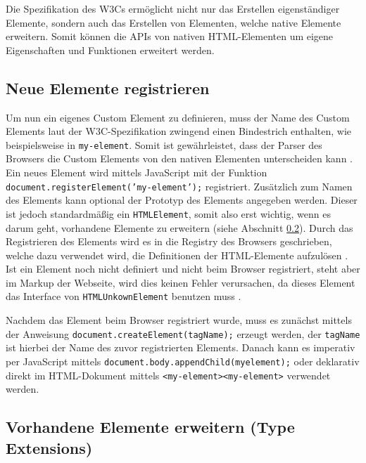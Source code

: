Die Spezifikation des \ac{W3C}s ermöglicht nicht nur das Erstellen eigenständiger Elemente, sondern auch das Erstellen von Elementen, welche native Elemente erweitern. Somit können die \ac{API}s von nativen \ac{HTML}-Elementen um eigene Eigenschaften und Funktionen erweitert werden.


\subsection{Neue Elemente registrieren}\label{neue-elemente-registrieren}

Um nun ein eigenes Custom Element zu definieren, muss der Name des Custom Elements laut der \ac{W3C}-Spezifikation zwingend einen Bindestrich enthalten, wie beispielsweise in \texttt{my-element}. Somit ist gewährleistet, dass der Parser des Browsers die Custom Elements von den nativen Elementen unterscheiden kann \cite{citeulike:13845061}. Ein neues Element wird mittels JavaScript mit der Funktion \texttt{document.registerElement('my-element');} registriert. Zusätzlich zum Namen des Elements kann optional der Prototyp des Elements angegeben werden. Dieser ist jedoch standardmäßig ein \texttt{HTMLElement}, somit also erst wichtig, wenn es darum geht, vorhandene Elemente zu erweitern (siehe Abschnitt \ref{vorhandene-elemente-erweitern-type-extensions}). Durch das Registrieren des Elements wird es in die Registry des Browsers geschrieben, welche dazu verwendet wird, die Definitionen der \ac{HTML}-Elemente aufzulösen \cite{citeulike:13844982}. Ist ein Element noch nicht definiert und nicht beim Browser registriert, steht aber im Markup der Webseite, wird dies keinen Fehler verursachen, da dieses Element das Interface von \texttt{HTMLUnkownElement} benutzen muss \cite{citeulike:13851253}.

Nachdem das Element beim Browser registriert wurde, muss es zunächst mittels der Anweisung \texttt{document.createElement(tagName);} erzeugt werden, der \texttt{tagName} ist hierbei der Name des zuvor registrierten Elements. Danach kann es imperativ per JavaScript mittels \texttt{document.body.appendChild(myelement);} oder deklarativ direkt im \ac{HTML}-Dokument mittels \texttt{\textless{}my-element\textgreater{}\textless{}my-element\textgreater{}} verwendet werden.

\noindent \cite[S. 127--138]{citeulike:13844975}


\subsection{Vorhandene Elemente erweitern (Type Extensions)}\label{vorhandene-elemente-erweitern-type-extensions}

